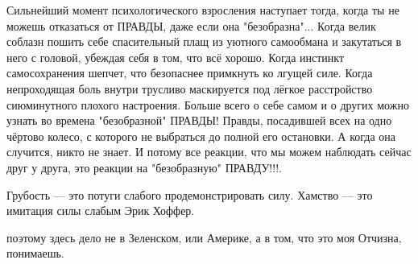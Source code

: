 Сильнейший момент психологического взросления наступает тогда, когда ты не можешь отказаться от ПРАВДЫ, даже если она "безобразна"...
Когда велик соблазн пошить себе спасительный плащ из уютного самообмана и закутаться в него с головой, убеждая себя в том, что всё хорошо.
Когда инстинкт самосохранения шепчет, что безопаснее примкнуть ко лгущей силе.
Когда непроходящая боль внутри трусливо маскируется под лёгкое расстройство сиюминутного плохого настроения.
Больше всего о себе самом и о других можно узнать во времена "безобразной" ПРАВДЫ!
Правды, посадившей всех на одно чёртово колесо, с которого не выбраться до полной его остановки. А когда она случится, никто не знает.
И потому все реакции, что мы можем наблюдать сейчас друг у друга, это реакции на "безобразную" ПРАВДУ!!!.

Грубость — это потуги слабого продемонстрировать силу. Хамство — это имитация
силы слабым Эрик Хоффер.

поэтому здесь дело не в Зеленском, или Америке, а в том, что это моя Отчизна,
понимаешь.

